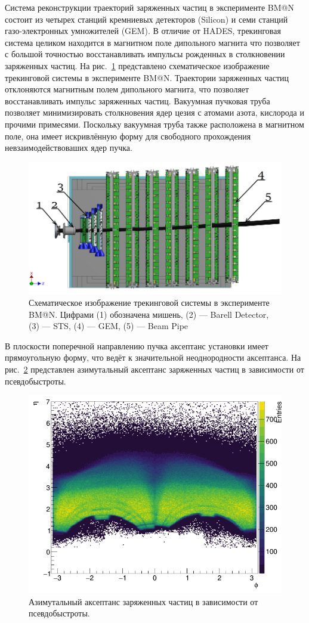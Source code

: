 Система реконструкции траекторий заряженных частиц в эксперименте BM@N состоит из четырех станций кремниевых детекторов (Silicon) и семи станций газо-электронных умножителей (GEM). 
В отличие от HADES, трекинговая система целиком находится в магнитном поле дипольного магнита что позволяет с большой точностью восстанавливать импульсы рожденных в столкновении заряженных частиц.
На рис.~\ref{fig:bmn_tracking} представлено схематическое изображение трекинговой системы в эксперименте BM@N.
Траектории заряженных частиц отклоняются магнитным полем дипольного магнита, что позволяет восстанавливать импульс заряженных частиц.
Вакуумная пучковая труба позволяет минимизировать столкновения ядер цезия с атомами азота, кислорода и прочими примесями.
Поскольку вакуумная труба также расположена в магнитном поле, она имеет искривлённую форму для свободного прохождения невзаимодействоваших ядер пучка.  
%
\begin{figure}[ht]
\begin{center}
    \includegraphics[width=0.75\linewidth]{images/bmn_tracking_system.png}
    \caption{Схематическое изображение трекинговой системы в эксперименте BM@N. Цифрами (1) обозначена мишень,
    (2) --- Barell Detector, (3) --- STS, (4) --- GEM, (5) --- Beam Pipe }
    \label{fig:bmn_tracking}
\end{center}
\end{figure}

В плоскости поперечной направлению пучка аксептанс установки имеет прямоугольную форму, что ведёт к значительной неоднородности аксептанса.
На рис.~\ref{fig:bmn_phi_eta} представлен азимутальный аксептанс заряженных частиц в зависимости от псевдобыстроты. 
%
\begin{figure}[ht]
\begin{center}
\includegraphics[width=0.55\linewidth]{images/bmn_phi_eta.png}
\caption{Азимутальный аксептанс заряженных частиц в зависимости от псевдобыстроты.}
\label{fig:bmn_phi_eta}
\end{center}
\end{figure}

